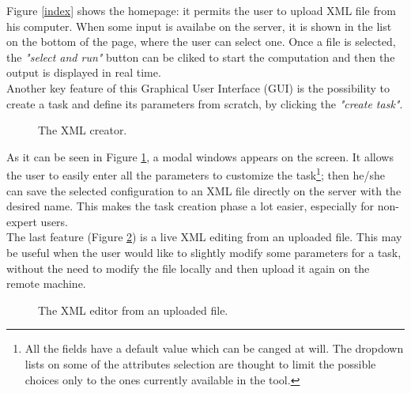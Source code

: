 Figure \ref{index} shows the homepage: it permits the user to upload XML file from his computer. When some input is availabe on the server, it is shown in the list on the bottom of the page, where the user can select one. Once a file is selected, the \emph{"select and run"} button can be cliked to start the computation and then the output is displayed in real time.\\
Another key feature of this Graphical User Interface (GUI) is the possibility to create a task and define its parameters from scratch, by clicking the \emph{"create task"}.

\begin{figure}[H]
  \caption{The XML creator.}
  \label{modal}
\end{figure}  

As it can be seen in Figure \ref{modal}, a modal windows appears on the screen. It allows the user to easily enter all the parameters to customize the task\footnote{All the fields have a default value which can be canged at will. The dropdown lists on some of the attributes selection are thought to limit the possible choices only to the ones currently available in the tool.}; then he/she can save the selected configuration to an XML file directly on the server with the desired name. This makes the task creation phase a lot easier, especially for non-expert users.\\
The last feature (Figure \ref{editor}) is a live XML editing from an uploaded file. This may be useful when the user would like to slightly modify some parameters for a task, without the need to modify the file locally and then upload it again on the remote machine.

\begin{figure}[H]
  \caption{The XML editor from an uploaded file.}
  \label{editor}
\end{figure}  